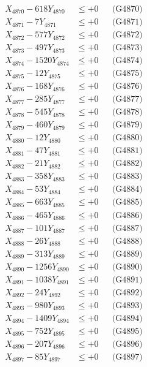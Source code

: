 \documentclass[a4paper,10pt]{article}
\begin{document}
{\begin{align}
X_{4870} - 618Y_{4870} &\leq +0 && \text{(G4870)} \\
\allowbreak
X_{4871} - 7Y_{4871} &\leq +0 && \text{(G4871)} \\
X_{4872} - 577Y_{4872} &\leq +0 && \text{(G4872)} \\
X_{4873} - 497Y_{4873} &\leq +0 && \text{(G4873)} \\
X_{4874} - 1520Y_{4874} &\leq +0 && \text{(G4874)} \\
X_{4875} - 12Y_{4875} &\leq +0 && \text{(G4875)} \\
X_{4876} - 168Y_{4876} &\leq +0 && \text{(G4876)} \\
X_{4877} - 285Y_{4877} &\leq +0 && \text{(G4877)} \\
X_{4878} - 545Y_{4878} &\leq +0 && \text{(G4878)} \\
X_{4879} - 460Y_{4879} &\leq +0 && \text{(G4879)} \\
X_{4880} - 12Y_{4880} &\leq +0 && \text{(G4880)} \\
\allowbreak
X_{4881} - 47Y_{4881} &\leq +0 && \text{(G4881)} \\
X_{4882} - 21Y_{4882} &\leq +0 && \text{(G4882)} \\
X_{4883} - 358Y_{4883} &\leq +0 && \text{(G4883)} \\
X_{4884} - 53Y_{4884} &\leq +0 && \text{(G4884)} \\
X_{4885} - 663Y_{4885} &\leq +0 && \text{(G4885)} \\
X_{4886} - 465Y_{4886} &\leq +0 && \text{(G4886)} \\
X_{4887} - 101Y_{4887} &\leq +0 && \text{(G4887)} \\
X_{4888} - 26Y_{4888} &\leq +0 && \text{(G4888)} \\
X_{4889} - 313Y_{4889} &\leq +0 && \text{(G4889)} \\
X_{4890} - 1256Y_{4890} &\leq +0 && \text{(G4890)} \\
\allowbreak
X_{4891} - 1038Y_{4891} &\leq +0 && \text{(G4891)} \\
X_{4892} - 24Y_{4892} &\leq +0 && \text{(G4892)} \\
X_{4893} - 980Y_{4893} &\leq +0 && \text{(G4893)} \\
X_{4894} - 1409Y_{4894} &\leq +0 && \text{(G4894)} \\
X_{4895} - 752Y_{4895} &\leq +0 && \text{(G4895)} \\
X_{4896} - 207Y_{4896} &\leq +0 && \text{(G4896)} \\
X_{4897} - 85Y_{4897} &\leq +0 && \text{(G4897)} \\

\end{align}}
\end{document}
